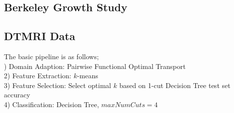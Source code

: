 \documentclass[]{article}
\begin{document}
\subsection{Berkeley Growth Study}



\subsection{DTMRI Data}\label{DTMRI}

The basic pipeline is as follows;\\

) Domain Adaption: Pairwise Functional Optimal Transport\\
2) Feature Extraction: $k$-means\\
3) Feature Selection: Select optimal $k$ based on 1-cut Decision Tree test set accuracy\\
4) Classification: Decision Tree, $maxNumCuts = 4$\\
\end{document}
